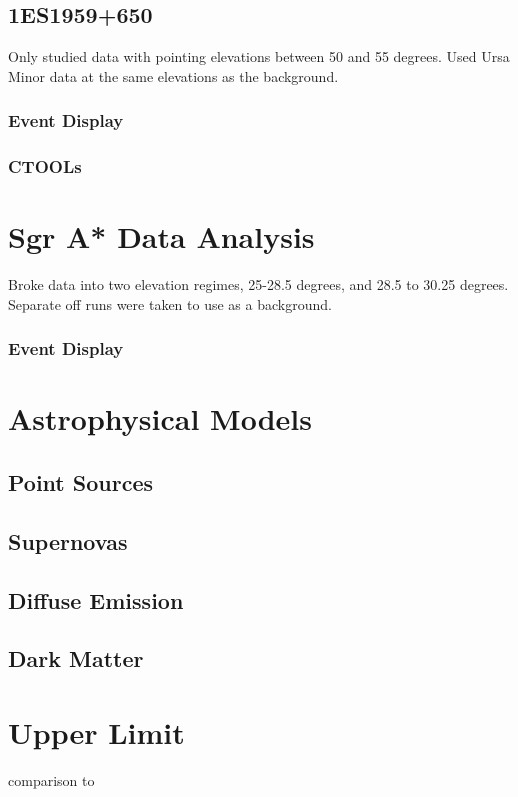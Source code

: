   \subsection{1ES1959+650}
    Only studied data with pointing elevations between 50 and 55 degrees.
    Used Ursa Minor data at the same elevations as the background.

    \subsubsection{Event Display}
    \subsubsection{CTOOLs}

\section{Sgr A* Data Analysis}
Broke data into two elevation regimes, 25-28.5 degrees, and 28.5 to 30.25 degrees.
Separate off runs were taken to use as a background.

  \subsubsection{Event Display}

\section{Astrophysical Models}

\subsection{Point Sources}

\subsection{Supernovas}

\subsection{Diffuse Emission}

\subsection{Dark Matter}

\section{Upper Limit}

comparison to 

